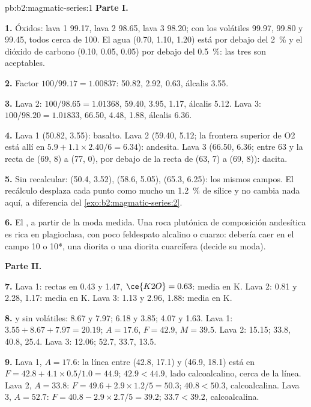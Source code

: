 \begin{solution}{pb:b2:magmatic-series:1}
\noindent\textbf{Parte I.}

\textbf{1.} Óxidos: lava 1 99.17, lava 2 98.65, lava 3 98.20; con los volátiles
99.97, 99.80 y 99.45, todos cerca de 100. El agua (0.70, 1.10, 1.20) está por debajo del
\qty{2}{\percent} y el dióxido de carbono (0.10, 0.05, 0.05) por debajo del \qty{0.5}{\percent}: las
tres son aceptables.

\textbf{2.} Factor $100/99.17 = 1.00837$:  50.82,  2.92, 
0.63, álcalis 3.55.

\textbf{3.} Lava 2: $100/98.65 = 1.01368$,  59.40,  3.95, 
1.17, álcalis 5.12. Lava 3: $100/98.20 = 1.01833$,  66.50,  4.48,
 1.88, álcalis 6.36.

\textbf{4.} Lava 1 (50.82, 3.55): basalto. Lava 2 (59.40, 5.12; la frontera superior de O2
está allí en $5.9 + 1.1\times2.40/6 = 6.34$): andesita. Lava 3 (66.50, 6.36; entre 63
y la recta de (69, 8) a (77, 0), por debajo de la recta de (63, 7) a (69, 8)): dacita.

\textbf{5.} Sin recalcular: (50.4, 3.52), (58.6, 5.05), (65.3, 6.25): los mismos campos. El
recálculo desplaza cada punto como mucho un \qty{1.2}{\percent} de sílice y no cambia
nada aquí, a diferencia del \cref{exo:b2:magmatic-series:2}.

\textbf{6.} El , a partir de la moda medida. Una roca plutónica de composición
andesítica es rica en plagioclasa, con poco feldespato alcalino o cuarzo: debería
caer en el campo 10 o 10*, una diorita o una diorita cuarcífera (decide su moda).

\noindent\textbf{Parte II.}

\textbf{7.} Lava 1: rectas en 0.43 y 1.47, $\ce{K2O} = 0.63$: media en K. Lava 2: 0.81
y 2.28, 1.17: media en K. Lava 3: 1.13 y 2.96, 1.88: media en K.

\textbf{8.}  y  sin volátiles: 8.67 y 7.97; 6.18 y 3.85; 4.07
y 1.63. Lava 1: $3.55 + 8.67 + 7.97 = 20.19$; $A = 17.6$, $F = 42.9$, $M = 39.5$.
Lava 2: 15.15; 33.8, 40.8, 25.4. Lava 3: 12.06; 52.7, 33.7, 13.5.

\textbf{9.} Lava 1, $A = 17.6$: la línea entre (42.8, 17.1) y (46.9, 18.1) está en
$F = 42.8 + 4.1\times0.5/1.0 = 44.9$; $42.9 < 44.9$, lado calcoalcalino, cerca de la
línea. Lava 2, $A = 33.8$: $F = 49.6 + 2.9\times1.2/5 = 50.3$; $40.8 < 50.3$,
calcoalcalina. Lava 3, $A = 52.7$: $F = 40.8 - 2.9\times2.7/5 = 39.2$; $33.7 < 39.2$,
calcoalcalina.


\end{solution}
